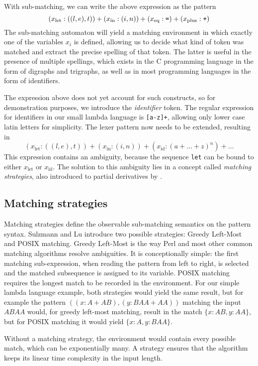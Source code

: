 With sub-matching, we can write the above expression as the pattern
%
\[(x_\text{let}:((l,e),t)) + (x_\text{in}:(i,n)) + (x_\text{eq}:\verb'=') +
(x_\text{plus}:\verb'+')\]
%
The sub-matching automaton will yield a matching environment in which exactly
one of the variables $x_i$ is defined, allowing us to decide what kind of token
was matched and extract the precise spelling of that token. The latter is useful
in the presence of multiple spellings, which exists in the C programming
language in the form of digraphs and trigraphs, as well as in most programming
languages in the form of identifiers.

The expression above does not yet account for such constructs, so for
demonstration purposes, we introduce the \textit{identifier} token. The regular
expression for identifiers in our small lambda language is \verb![a-z]+!,
allowing only lower case latin letters for simplicity. The lexer pattern now
needs to be extended, resulting in
%
\[(x_\text{let}:((l,e),t)) + (x_\text{in}:(i,n)) + (x_\text{id}:(a+\dots+z)^n) +
\dots\]
%
This expression contains an ambiguity, because the sequence \verb!let! can be
bound to either $x_\text{let}$ or $x_\text{id}$. The solution to this ambiguity
lies in a concept called \textit{matching strategies}, also introduced to
partial derivatives by \cite{pdpat}.

\subsection{Matching strategies}

Matching strategies define the observable sub-matching semantics on the pattern
syntax. Sulzmann and Lu introduce two possible strategies: Greedy Left-Most and
POSIX matching. Greedy Left-Most is the way Perl and most other common matching
algorithms resolve ambiguities. It is conceptionally simple: the first matching
sub-expression, when reading the pattern from left to right, is selected and the
matched subsequence is assigned to its variable.
POSIX matching requires the longest match to be recorded in the environment. For
our simple lambda language example, both strategies would yield the same result,
but for example the pattern $((x:A+AB),(y:BAA+AA))$ matching the input $ABAA$
would, for greedy left-most matching, result in the match $\{x:AB, y:AA\}$, but
for POSIX matching it would yield $\{x:A, y:BAA\}$.

Without a matching strategy, the environment would contain every possible match,
which can be exponentially many. A strategy ensures that the algorithm keeps its
linear time complexity in the input length.


